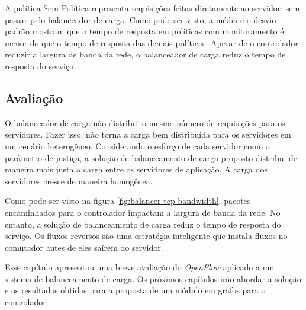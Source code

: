 A política Sem Política representa requisições feitas diretamente ao servidor, 
sem passar pelo balanceador de carga.
Como pode ser visto, a média e o desvio padrão mostram que o tempo de resposta
em políticas com monitoramento é menor do que o tempo de resposta das demais
políticas.
Apesar de o controlador reduzir a largura de banda da rede, o balanceador 
de carga reduz o tempo de resposta do serviço.

\subsection{Avaliação}

O balanceador de carga não distribui o mesmo número de requisições para 
os servidores.
Fazer isso, não torna a carga bem distribuída para os servidores em um 
cenário heterogêneo. 
Considerando o esforço de cada servidor como o parâmetro de justiça, a solução
de balanceamento de carga proposto distribui de maneira mais justa a carga 
entre os servidores de aplicação.
A carga dos servidores cresce de maneira homogênea.

Como pode ser visto na figura \ref{fig:balancer-tcp-bandwidth}, pacotes 
encaminhados para o controlador impactam a largura de banda da rede.
No entanto, a solução de balanceamento de carga reduz o tempo de resposta 
do serviço. 
Os fluxos reversos são uma estratégia inteligente que instala fluxos no 
comutador antes de eles saírem do servidor.

Esse capítulo apresentou uma breve avaliação do \emph{OpenFlow} aplicado 
a um sistema de balanceamento de carga.
Os próximos capítulos irão abordar a solução e os resultados obtidos para
a proposta de um módulo em grafos para o controlador.
